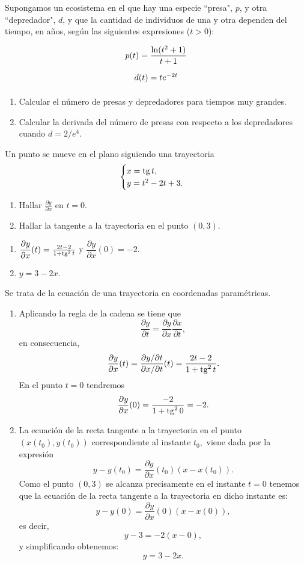 {Supongamos un ecosistema en el que hay una especie ``presa", $p$, y otra ``depredador", $d$, y que la cantidad de individuos de una y otra dependen del tiempo, en años, según las siguientes expresiones ($t>0$):
\[
\renewcommand{\arraystretch}{2.2}
\begin{array}{*{20}c}
   {p(t) = \dfrac{{\ln (t^2  + 1)}}{{t + 1}}}  \\
   {d(t) = te^{ - 2t} }  \\
\end{array}
\]
\begin{enumerate}
\item Calcular el número de presas y depredadores para tiempos muy grandes.
\item Calcular la derivada del número de presas con respecto a los depredadores cuando $d=2/e^4$.
\end{enumerate}
}


{Un punto se mueve en el plano siguiendo una trayectoria
\[
\begin{cases}
x = \operatorname{tg} t,  \\
y = t^2-2t+3. \\
\end{cases}
\]

\begin{enumerate}
\item  Hallar $\frac{\partial y}{\partial x}$ en $t=0$.
\item  Hallar la tangente a la trayectoria en el punto $(0,3)$.
\end{enumerate}
}
{\begin{enumerate}
\item $\dfrac{\partial y}{\partial x}(t) = \frac{2t-2}{1+\operatorname{tg}^2t}$ y $\dfrac{\partial y}{\partial x}(0) = -2$.
\item $y = 3-2x$.
\end{enumerate}
}
{Se trata de la ecuación de una trayectoria en coordenadas paramétricas.
\begin{enumerate}
\item  Aplicando la regla de la cadena se tiene que
\[
\dfrac{\partial y}{\partial t} = \dfrac{\partial y}{\partial x}\dfrac{\partial x}{\partial t},
\]
en consecuencia,
\[
\dfrac{\partial y}{\partial x}(t) = \frac{\partial y/\partial t}{\partial x/\partial t}(t)=\frac{2t-2}{1+\operatorname{tg}^2t}.
\]
En el punto $t=0$ tendremos
\[
\dfrac{\partial y}{\partial x}(0) = \frac{-2}{1+\operatorname{tg}^20} = -2.
\]

\item  La ecuación de la recta tangente a la trayectoria en el punto $(x(t_0),y(t_0))$ correspondiente al instante $t_0,$ viene dada por la expresión
\[
y-y(t_0) = \dfrac{\partial y}{\partial x}(t_0)(x-x(t_0)).
\]
Como el punto $(0,3)$ se alcanza precisamente en el instante $t=0$ tenemos que la ecuación de la recta tangente a la trayectoria en dicho instante es:
\[
y-y(0) = \dfrac{\partial y}{\partial x}(0)(x-x(0)),
\]
es decir,
\[
y-3 = -2(x-0),
\]
y simplificando obtenemos:
\[
y = 3-2x.
\]
\end{enumerate}
}



